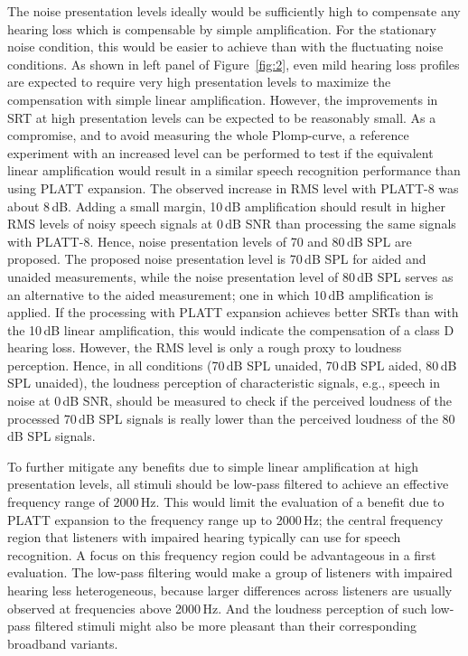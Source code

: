 \documentclass[10pt,a4paper,twocolumn]{article}
\begin{document}
The noise presentation levels ideally would be sufficiently high to compensate any hearing loss which is compensable by simple amplification.
%
For the stationary noise condition, this would be easier to achieve than with the fluctuating noise conditions.
%
As shown in left panel of Figure~\ref{fig:2}, even mild hearing loss profiles are expected to require very high presentation levels to maximize the compensation with simple linear amplification.
%
However, the improvements in SRT at high presentation levels can be expected to be reasonably small.
%
As a compromise, and to avoid measuring the whole Plomp-curve, a reference experiment with an increased level can be performed to test if the equivalent linear amplification would result in a similar speech recognition performance than using PLATT expansion.
%
The observed increase in RMS level with PLATT-8 was about 8\,dB.
%
Adding a small margin, 10\,dB amplification should result in higher RMS levels of noisy speech signals at 0\,dB SNR than processing the same signals with PLATT-8.
%
Hence, noise presentation levels of 70 and 80\,dB SPL are proposed.
%
The proposed noise presentation level is 70\,dB SPL for aided and unaided measurements, while the noise presentation level of 80\,dB SPL serves as an alternative to the aided measurement; one in which 10\,dB amplification is applied.
%
If the processing with PLATT expansion achieves better SRTs than with the 10\,dB linear amplification, this would indicate the compensation of a class D hearing loss.
%
However, the RMS level is only a rough proxy to loudness perception.
%
Hence, in all conditions (70\,dB SPL unaided, 70\,dB SPL aided, 80\,dB SPL unaided), the loudness perception of characteristic signals, e.g., speech in noise at 0\,dB SNR, should be measured to check if the perceived loudness of the processed 70\,dB SPL signals is really lower than the perceived loudness of the 80\,dB SPL signals.

To further mitigate any benefits due to simple linear amplification at high presentation levels, all stimuli should be low-pass filtered to achieve an effective frequency range of 2000\,Hz.
%
This would limit the evaluation of a benefit due to PLATT expansion to the frequency range up to 2000\,Hz; the central frequency region that listeners with impaired hearing typically can use for speech recognition.
%
A focus on this frequency region could be advantageous in a first evaluation.
%
The low-pass filtering would make a group of listeners with impaired hearing less heterogeneous, because larger differences across listeners are usually observed at frequencies above 2000\,Hz. 
%
And the loudness perception of such low-pass filtered stimuli might also be more pleasant than their corresponding broadband variants.
\end{document}
